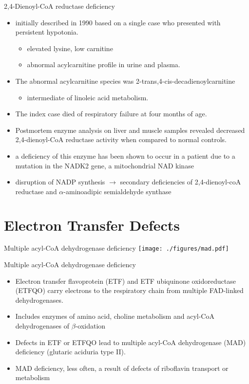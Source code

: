 \documentclass[presentation, smaller]{beamer}
\begin{document}
\begin{frame}[label={sec:orgheadline36}]{2,4-Dienoyl-CoA reductase deficiency}
\begin{itemize}
\item initially described in 1990 based on a single case who presented with persistent hypotonia.
\begin{itemize}
\item elevated lysine, low carnitine
\item abnormal acylcarnitine profile in urine and plasma.
\end{itemize}
\item The abnormal acylcarnitine species was 2-trans,4-cis-decadienoylcarnitine
\begin{itemize}
\item intermediate of linoleic acid metabolism.
\end{itemize}
\item The index case died of respiratory failure at four months of age.
\item Postmortem enzyme analysis on liver and muscle samples revealed
decreased 2,4-dienoyl-CoA reductase activity when compared to normal
controls.
\item a deficiency of this enzyme has been shown to occur
in a patient due to a mutation in the NADK2 gene, a mitochondrial
NAD kinase
\item disruption of NADP synthesis \(\to\) secondary deficiencies of
2,4-dienoyl-coA reductase and \(\alpha\)-aminoadipic semialdehyde
synthase
\end{itemize}
\end{frame}

\section{Electron Transfer Defects}
\label{sec:orgheadline42}
\begin{frame}[label={sec:orgheadline38}]{Multiple acyl-CoA dehydrogenase deficiency}
\texttt{[image: ./figures/mad.pdf]}
\end{frame}
\begin{frame}[label={sec:orgheadline39}]{Multiple acyl-CoA dehydrogenase deficiency}
\begin{itemize}
\item Electron transfer flavoprotein (ETF) and ETF ubiquinone
oxidoreductase (ETFQO) carry electrons to the respiratory chain from
multiple FAD-linked dehydrogenases.
\item Includes enzymes of amino acid, choline metabolism and acyl-CoA
dehydrogenases of \(\beta\)-oxidation
\item Defects in ETF or ETFQO lead to multiple acyl-CoA dehydrogenase
(MAD) deficiency (glutaric aciduria type II).
\item MAD deficiency, less often, a result of defects of riboflavin
transport or metabolism
\end{itemize}
\end{frame}
\end{document}
